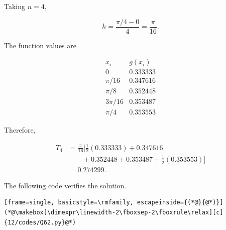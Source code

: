 \begin{enumerate}[label=\thesubsection.\arabic*, ref=\thesubsection.\theenumi]
Taking $n=4$,

\[
h=\frac{\pi/4-0}{4}=\frac{\pi}{16}.
\]

The function values are

\[
\begin{array}{c|c}
x_i & g(x_i)\\ \hline
0 & 0.333333\\
\pi/16 & 0.347616\\
\pi/8 & 0.352448\\
3\pi/16 & 0.353487\\
\pi/4 & 0.353553
\end{array}
\]

Therefore,

\begin{align*}
    T_4 &= \frac{\pi}{16}\bigg[
    \frac12(0.333333)+0.347616\\
    &\qquad+0.352448+0.353487
    +\frac12(0.353553)\bigg]\\
    &= 0.274299.
\end{align*}

    The following code verifies the solution.

    \begin{lstlisting}[frame=single, basicstyle=\rmfamily, escapeinside={(*@}{@*)}]
(*@\makebox[\dimexpr\linewidth-2\fboxsep-2\fboxrule\relax][c]{12/codes/Q62.py}@*)
    \end{lstlisting}

    \end{enumerate}


